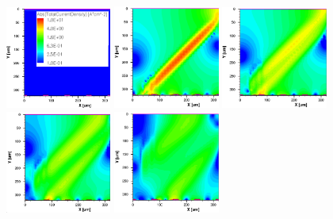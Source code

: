 \begin{figure}[ht!b]
\label{fig:sd}
  \centering
  \includegraphics[width=0.31\textwidth]{figures/silicon/silicon_t0.0.png}
  \includegraphics[width=0.31\textwidth]{figures/silicon/silicon_t1.1.png}
  \includegraphics[width=0.31\textwidth]{figures/silicon/silicon_t1.5.png}\\
  \includegraphics[width=0.31\textwidth]{figures/silicon/silicon_t2.0.png}
  \includegraphics[width=0.31\textwidth]{figures/silicon/silicon_t3.0.png}

\end{figure}
